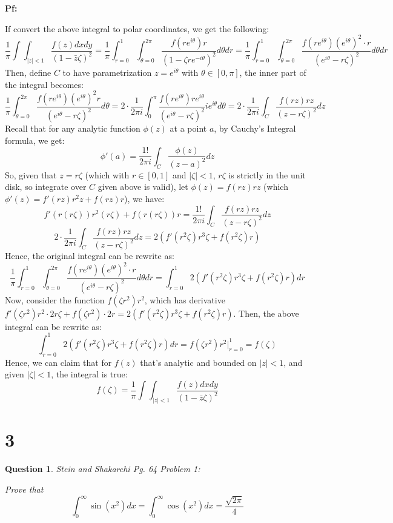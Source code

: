 \documentclass{article}
\newtheorem{question}{Question}
\begin{document}
\textbf{Pf:}

If convert the above integral to polar coordinates, we get the following:
$$\frac{1}{\pi}\int\int_{|z|<1}\frac{f(z)dxdy}{(1-\bar{z}\zeta)^2}=\frac{1}{\pi}\int_{r=0}^{1}\int_{\theta=0}^{2\pi}\frac{f(re^{i\theta})r}{(1-\zeta re^{-i\theta})^2}d\theta dr = \frac{1}{\pi}\int_{r=0}^{1}\int_{\theta=0}^{2\pi}\frac{f(re^{i\theta})(e^{i\theta})^2\cdot r}{(e^{i\theta}-r\zeta)^2}d\theta dr$$
Then, define $C$ to have parametrization $z=e^{i\theta}$ with $\theta\in [0,\pi]$, the inner part of the integral becomes:
$$\frac{1}{\pi}\int_{\theta=0}^{2\pi}\frac{f(re^{i\theta})(e^{i\theta})^2r}{(e^{i\theta}-r\zeta)^2}d\theta =2\cdot \frac{1}{2\pi i}\int_{0}^{\pi}\frac{f(re^{i\theta})re^{i\theta}}{(e^{i\theta}-r\zeta)^2}ie^{i\theta}d\theta = 2\cdot\frac{1}{2\pi i}\int_{C}\frac{f(rz)rz}{(z-r\zeta)^2}dz$$
Recall that for any analytic function $\phi(z)$ at a point $a$, by Cauchy's Integral formula, we get:
$$\phi'(a)=\frac{1!}{2\pi i}\int_{C}\frac{\phi(z)}{(z-a)^2}dz$$
So, given that $z=r\zeta$ (which with $r\in [0,1]$ and $|\zeta|<1$, $r\zeta$ is strictly in the unit disk, so integrate over $C$ given above is valid), let $\phi(z)=f(rz)rz$ (which $\phi'(z)=f'(rz)r^2z + f(rz)r$), we have:
$$f'(r(r\zeta))r^2(r\zeta) + f(r(r\zeta))r = \frac{1!}{2\pi i}\int_{C}\frac{f(rz)rz}{(z-r\zeta)^2}dz$$
$$2\cdot\frac{1}{2\pi i}\int_{C}\frac{f(rz)rz}{(z-r\zeta)^2}dz = 2\left(f'(r^2\zeta)r^3\zeta + f(r^2\zeta)r\right)$$
Hence, the original integral can be rewrite as:
$$\frac{1}{\pi}\int_{r=0}^{1}\int_{\theta=0}^{2\pi}\frac{f(re^{i\theta})(e^{i\theta})^2\cdot r}{(e^{i\theta}-r\zeta)^2}d\theta dr = \int_{r=0}^{1}2\left(f'(r^2\zeta)r^3\zeta + f(r^2\zeta)r\right) dr$$
Now, consider the function $f(\zeta r^2)r^2$, which has derivative $f'(\zeta r^2)r^2\cdot 2r\zeta + f(\zeta r^2)\cdot 2r = 2\left(f'(r^2\zeta)r^3\zeta + f(r^2\zeta)r\right)$. 
Then, the above integral can be rewrite as:
$$\int_{r=0}^{1}2\left(f'(r^2\zeta)r^3\zeta + f(r^2\zeta)r\right) dr = f(\zeta r^2)r^2\bigg|_{r=0}^{1} = f(\zeta)$$
Hence, we can claim that for $f(z)$ that's analytic and bounded on $|z|<1$, and given $|\zeta|<1$, the integral is true:
$$f(\zeta)=\frac{1}{\pi}\int\int_{|z|<1}\frac{f(z)dxdy}{(1-\bar{z}\zeta)^2}$$

\break

\section*{3}
\begin{myBox}[]{}
    \begin{question}
        Stein and Shakarchi Pg. 64 Problem 1:

        Prove that
        $$\int_{0}^{\infty}\sin(x^2)dx = \int_{0}^{\infty}\cos(x^2)dx = \frac{\sqrt{2\pi}}{4}$$
    \end{question}
\end{myBox}
\end{document}
